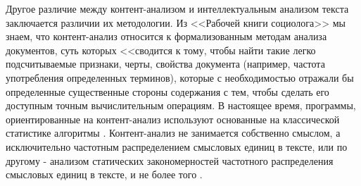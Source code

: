 

Другое различие между контент-анализом и интеллектуальным анализом текста заключается различии их методологии. Из <<Рабочей книги социолога>> мы знаем, что контент-анализ относится к формализованным методам анализа документов, суть которых <<сводится к тому, чтобы найти такие легко подсчитываемые признаки, черты, свойства документа (например, частота употребления определенных терминов), которые с необходимостью отражали бы определенные существенные стороны содержания с тем, чтобы сделать его доступным точным вычислительным операциям. В настоящее время, программы, ориентированные на контент-анализ используют основанные на классической статистике алгоритмы \cite[стр. 735]{tm_and_ca}. Контент-анализ не занимается собственно смыслом, а исключительно частотным распределением смысловых единиц в тексте, или по другому - анализом статических закономерностей частотного распределения смысловых единиц в тексте, и не более того \cite[стр. 15]{Averianov2007}. 

